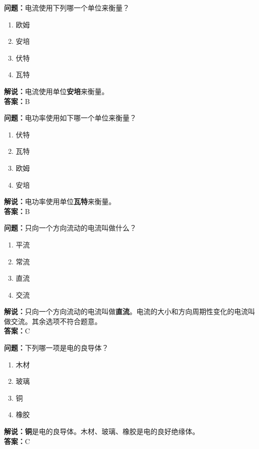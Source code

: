 \textbf{问题：}电流使用下列哪一个单位来衡量？

\begin{enumerate}[label=\Alph*), leftmargin=1.5cm]
	\item 欧姆
	\item 安培
	\item 伏特
	\item 瓦特
\end{enumerate}

\textbf{解说：}电流使用单位\textbf{安培}来衡量。\\\textbf{答案：}B



\textbf{问题：}电功率使用如下哪一个单位来衡量？

\begin{enumerate}[label=\Alph*), leftmargin=1.5cm]
	\item 伏特
	\item 瓦特
	\item 欧姆
	\item 安培
\end{enumerate}

\textbf{解说：}电功率使用单位\textbf{瓦特}来衡量。\\\textbf{答案：}B



\textbf{问题：}只向一个方向流动的电流叫做什么？

\begin{enumerate}[label=\Alph*), leftmargin=1.5cm]
	\item 平流
	\item 常流
	\item 直流
	\item 交流
\end{enumerate}

\textbf{解说：}只向一个方向流动的电流叫做\textbf{直流}。电流的大小和方向周期性变化的电流叫做交流。其余选项不符合题意。\\\textbf{答案：}C


\textbf{问题：}下列哪一项是电的良导体？

\begin{enumerate}[label=\Alph*), leftmargin=1.5cm]
	\item 木材
	\item 玻璃
	\item 铜
	\item 橡胶
\end{enumerate}

\textbf{解说：}\textbf{铜}是电的良导体。木材、玻璃、橡胶是电的良好绝缘体。\\\textbf{答案：}C



